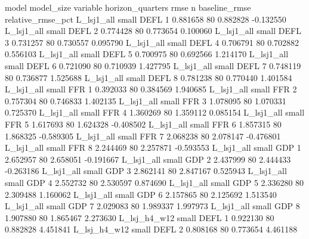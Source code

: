          model model_size variable  horizon_quarters     rmse  n  baseline_rmse  relative_rmse_pct
    L_lsj1_all      small     DEFL                 1 0.881658 80       0.882828          -0.132550
    L_lsj1_all      small     DEFL                 2 0.774428 80       0.773654           0.100060
    L_lsj1_all      small     DEFL                 3 0.731257 80       0.730557           0.095790
    L_lsj1_all      small     DEFL                 4 0.706791 80       0.702882           0.556103
    L_lsj1_all      small     DEFL                 5 0.700975 80       0.692566           1.214170
    L_lsj1_all      small     DEFL                 6 0.721090 80       0.710939           1.427795
    L_lsj1_all      small     DEFL                 7 0.748119 80       0.736877           1.525688
    L_lsj1_all      small     DEFL                 8 0.781238 80       0.770440           1.401584
    L_lsj1_all      small      FFR                 1 0.392033 80       0.384569           1.940685
    L_lsj1_all      small      FFR                 2 0.757304 80       0.746833           1.402135
    L_lsj1_all      small      FFR                 3 1.078095 80       1.070331           0.725370
    L_lsj1_all      small      FFR                 4 1.360269 80       1.359112           0.085154
    L_lsj1_all      small      FFR                 5 1.617693 80       1.624328          -0.408502
    L_lsj1_all      small      FFR                 6 1.857315 80       1.868325          -0.589305
    L_lsj1_all      small      FFR                 7 2.068238 80       2.078147          -0.476801
    L_lsj1_all      small      FFR                 8 2.244469 80       2.257871          -0.593553
    L_lsj1_all      small      GDP                 1 2.652957 80       2.658051          -0.191667
    L_lsj1_all      small      GDP                 2 2.437999 80       2.444433          -0.263186
    L_lsj1_all      small      GDP                 3 2.862141 80       2.847167           0.525943
    L_lsj1_all      small      GDP                 4 2.552732 80       2.530597           0.874690
    L_lsj1_all      small      GDP                 5 2.336280 80       2.309488           1.160062
    L_lsj1_all      small      GDP                 6 2.157865 80       2.125692           1.513540
    L_lsj1_all      small      GDP                 7 2.029083 80       1.989337           1.997973
    L_lsj1_all      small      GDP                 8 1.907880 80       1.865467           2.273630
  L_lsj_h4_w12      small     DEFL                 1 0.922130 80       0.882828           4.451841
  L_lsj_h4_w12      small     DEFL                 2 0.808168 80       0.773654           4.461188
